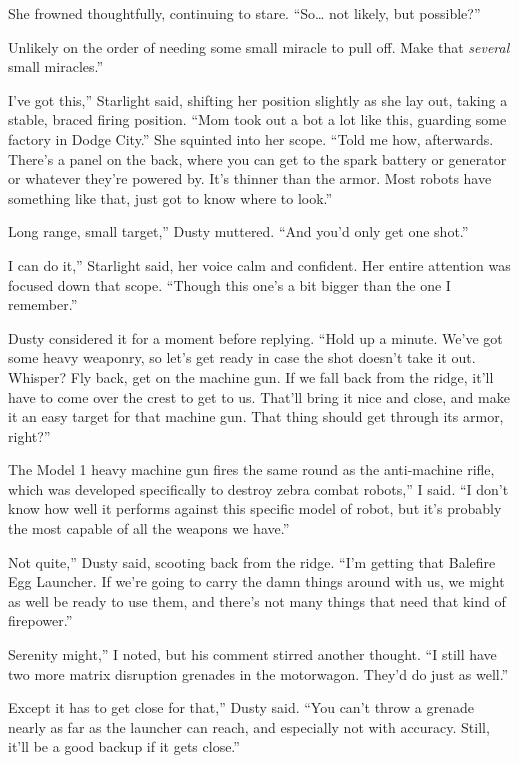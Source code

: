 She frowned thoughtfully, continuing to stare. “So… not likely, but possible?”

\leavevmode{}Unlikely on the order of needing some small miracle to pull off. Make that \textit{several} small miracles.”

\leavevmode{}I’ve got this,” Starlight said, shifting her position slightly as she lay out, taking a stable, braced firing position. “Mom took out a bot a lot like this, guarding some factory in Dodge City.” She squinted into her scope. “Told me how, afterwards. There’s a panel on the back, where you can get to the spark battery or generator or whatever they’re powered by. It’s thinner than the armor. Most robots have something like that, just got to know where to look.”

\leavevmode{}Long range, small target,” Dusty muttered. “And you’d only get one shot.”

\leavevmode{}I can do it,” Starlight said, her voice calm and confident. Her entire attention was focused down that scope. “Though this one’s a bit bigger than the one I remember.”

Dusty considered it for a moment before replying. “Hold up a minute. We’ve got some heavy weaponry, so let’s get ready in case the shot doesn’t take it out. Whisper? Fly back, get on the machine gun. If we fall back from the ridge, it’ll have to come over the crest to get to us. That’ll bring it nice and close, and make it an easy target for that machine gun. That thing should get through its armor, right?”

\leavevmode{}The Model 1 heavy machine gun fires the same round as the anti-machine rifle, which was developed specifically to destroy zebra combat robots,” I said. “I don’t know how well it performs against this specific model of robot, but it’s probably the most capable of all the weapons we have.”

\leavevmode{}Not quite,” Dusty said, scooting back from the ridge. “I’m getting that Balefire Egg Launcher. If we’re going to carry the damn things around with us, we might as well be ready to use them, and there’s not many things that need that kind of firepower.”

\leavevmode{}Serenity might,” I noted, but his comment stirred another thought. “I still have two more matrix disruption grenades in the motorwagon. They’d do just as well.”

\leavevmode{}Except it has to get close for that,” Dusty said. “You can’t throw a grenade nearly as far as the launcher can reach, and especially not with accuracy. Still, it’ll be a good backup if it gets close.”

